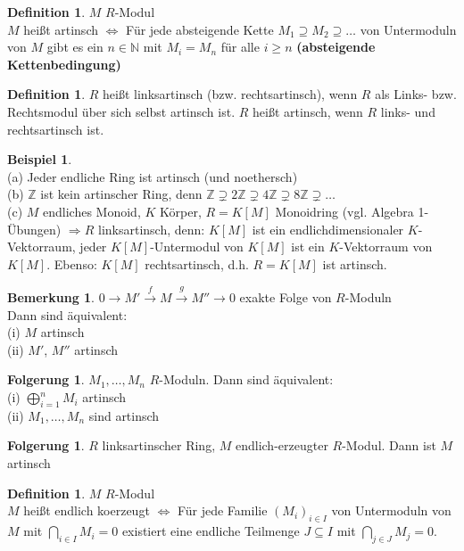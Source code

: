 \documentclass[10pt,a4paper,numbers=endperiod]{scrreprt}
\theoremstyle{definition}
\newtheorem{defi}[satz]{Definition}
\newtheorem{bem}[satz]{Bemerkung}
\newtheorem{bsp}[satz]{Beispiel}
\newtheorem{folg}[satz]{Folgerung}
\def\NN{{\mathbb N}}
\def\ZZ{{\mathbb Z}}
\begin{document}
\begin{defi}
	$M$ $R$-Modul\\
	$M$ heißt artinsch $\Leftrightarrow$ Für jede absteigende Kette $M_1 \supseteq M_2 \supseteq \ldots$ von Untermoduln von $M$ gibt es ein $n \in \NN$ mit $M_i = M_n$ für alle $i \geq n$ 
	\textbf{(absteigende Kettenbedingung)} 
\end{defi}

\begin{defi}
	$R$ heißt linksartinsch (bzw. rechtsartinsch), wenn $R$ als Links- bzw. Rechtsmodul über sich selbst artinsch ist. $R$ heißt artinsch, wenn $R$ links- und rechtsartinsch ist.
\end{defi}

\begin{bsp}
	$ $\\
	(a) Jeder endliche Ring ist artinsch (und noethersch)\\
	(b) $\ZZ$ ist kein artinscher Ring, denn $\ZZ \supsetneq 2 \ZZ \supsetneq 4 \ZZ \supsetneq 8 \ZZ \supsetneq \ldots$\\
	(c) $M$ endliches Monoid, $K$ Körper, $R = K[M]$ Monoidring (vgl. Algebra 1- Übungen) $\Rightarrow R$ linksartinsch, denn: $K[M]$ ist ein endlichdimensionaler $K$-Vektorraum, jeder $K[M]$-Untermodul von $K[M]$ ist ein $K$-Vektorraum von $K[M]$. Ebenso: $K[M]$ rechtsartinsch, d.h. $R = K[M]$ ist artinsch.
\end{bsp}

\begin{bem}
	$0 \rightarrow M' \overset{f}{\rightarrow} M \overset{g}{\rightarrow} M'' \rightarrow 0$ exakte Folge von $R$-Moduln\\
	Dann sind äquivalent:\\
	(i) $M$ artinsch\\
	(ii) $M'$, $M''$ artinsch
\end{bem}

\begin{folg}
	$M_1, \ldots, M_n$ $R$-Moduln. Dann sind äquivalent:\\
	(i) $\bigoplus\limits_{i = 1}^n M_i$ artinsch\\
	(ii) $M_1, \ldots, M_n$ sind artinsch
\end{folg}

\begin{folg}
	$R$ linksartinscher Ring, $M$ endlich-erzeugter $R$-Modul. Dann ist $M$ artinsch
\end{folg}

\begin{defi}
	$M$ $R$-Modul\\
	$M$ heißt endlich koerzeugt $\Leftrightarrow$ Für jede Familie $(M_i)_{i \in I}$ von Untermoduln von $M$ mit $\bigcap\limits_{i \in I} M_i = 0$ existiert eine endliche Teilmenge $J \subseteq I$ mit $\bigcap\limits_{j \in J} M_j = 0$.
\end{defi}
\end{document}
